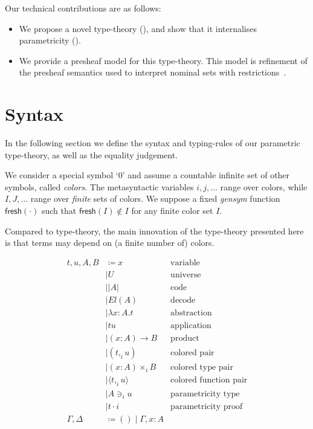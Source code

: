 \documentclass[english]{PaperTools/latex/lipics}
\newcommand\CP[3]{(#2,_{#1} #3)}
\newcommand\CTimes[2]{(#2) ×_{#1}}
\newcommand\param[1]{\!\cdot\!#1}
\newcommand\op[1]{∋_{#1}}
\newcommand\fp[3]{⟨#2 ,_{#1} #3⟩}
\newcommand\comment[1]{}
\def\fresh#1{\mathsf{fresh}(#1)}
\begin{document}
Our technical contributions are as follows:
\begin{itemize}
\item We propose a novel type-theory (), and show
  that it internalises parametricity ().
\item We provide a presheaf model for this type-theory.
      This model is refinement of the presheaf semantics used to
      interpret nominal sets with
      restrictions~\citep{bezem2014model,DBLP:journals/corr/Pitts14}.
\end{itemize}

\section{Syntax}
\label{sec:syntax}
In the following section we define the syntax and typing-rules of our
parametric type-theory, as well as the equality judgement.

We consider a special symbol ‘0’ and assume a countable infinite set of other
symbols, called \emph{colors}.
The metasyntactic variables $i,j,\ldots$ range over colors, while
$I,J,…$ range over \emph{finite} sets of colors.
We suppose a fixed \emph{gensym} function $\fresh{·}$ such that
$\fresh{I} ∉ I$ for any finite color set $I$.

Compared to type-theory, the main innovation of the type-theory
presented here is that terms may depend on (a finite number of)
colors.
\begin{definition}
  \begin{align*}
    t,u,A,B & \coloneqq x & \text {variable} \\
            & \mid U & \text{universe} \\ 
            & \mid |A| & \text{code} \\ 
            & \mid El(A) & \text{decode} \\ 
            & \mid λx:A. t & \text{abstraction} \\
            & \mid t u & \text{application} \\ 
            & \mid (x:A) → B & \text{product} \\
            & \mid \CP i t u & \text{colored pair} \\
            & \mid \CTimes i {x:A} B  & \text{colored type pair} \\
            & \mid \fp i t u & \text{colored function pair}\\
            & \mid A \op i u & \text{parametricity type} \\
            & \mid t \param i & \text{parametricity proof} \\
    \Gamma,\Delta & \coloneqq () \mid \Gamma,x:A
  \end{align*}
\end{definition}
\end{document}
